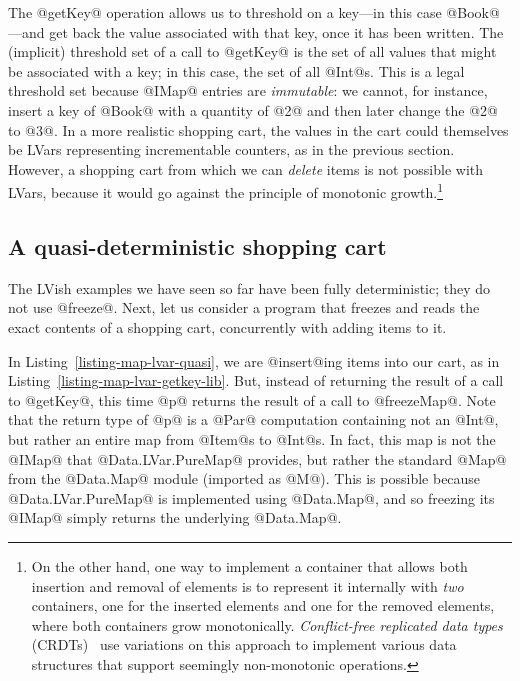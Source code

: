 The @getKey@ operation allows us to threshold on a key---in this case
@Book@---and get back the value associated with that key, once it has
been written.  The (implicit) threshold set of a call to @getKey@ is
the set of all values that might be associated with a key; in this
case, the set of all @Int@s.  This is a legal threshold set because
@IMap@ entries are \emph{immutable}: we cannot, for instance, insert a
key of @Book@ with a quantity of @2@ and then later change the @2@ to
@3@.  In a more realistic shopping cart, the values in the cart could
themselves be LVars representing incrementable counters, as in the
previous section.  However, a shopping cart from which we can
\emph{delete} items is not possible with LVars, because it would go
against the principle of monotonic growth.\footnote{On the other hand,
  one way to implement a container that allows both insertion and
  removal of elements is to represent it internally with \emph{two}
  containers, one for the inserted elements and one for the removed
  elements, where both containers grow monotonically.
  \emph{Conflict-free replicated data types} (CRDTs)~\cite{crdts} use
  variations on this approach to implement various data structures
  that support seemingly non-monotonic operations.  }

\subsection{A quasi-deterministic shopping cart}

The LVish examples we have seen so far have been fully deterministic;
they do not use @freeze@.  Next, let us consider a program that
freezes and reads the exact contents of a shopping cart, concurrently
with adding items to it.

\singlespacing

\doublespacing

In Listing~\ref{listing-map-lvar-quasi}, we are @insert@ing items into
our cart, as in Listing~\ref{listing-map-lvar-getkey-lib}.  But,
instead of returning the result of a call to @getKey@, this time @p@
returns the result of a call to @freezeMap@.  Note that the return
type of @p@ is a @Par@ computation containing not an @Int@, but rather
an entire map from @Item@s to @Int@s.  In fact, this map is not the
@IMap@ that @Data.LVar.PureMap@ provides, but rather the standard
@Map@ from the @Data.Map@ module (imported as @M@).  This is possible
because @Data.LVar.PureMap@ is implemented using @Data.Map@, and so
freezing its @IMap@ simply returns the underlying @Data.Map@.

